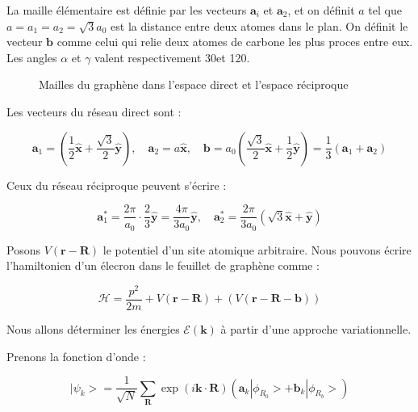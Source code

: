 La maille élémentaire est définie par les vecteurs $\mathbf{a}_i$ et
$\mathbf{a}_2$, et on définit $a$ tel que $a=a_1=a_2 = \sqrt{3}a_0$ est la
distance entre deux atomes dans le plan. On définit le vecteur $\mathbf{b}$ comme
celui qui relie deux atomes de carbone les plus proces entre eux. Les angles
$\alpha$ et $\gamma$ valent respectivement 30\textdegree et 120\textdegree.


\begin{figure}
    \TODO
    \caption{Mailles du graphène dans l'espace direct et l'espace réciproque}
    \label{fig:maillegraphene}
\end{figure}

Les vecteurs du réseau direct sont :

\begin{equation}
    \mathbf{a}_1 =
    (\frac{1}{2}\mathbf{\hat{x}}+\frac{\sqrt{3}}{2}\hat{\mathbf{y}}),\quad
    \mathbf{a}_2 = a \mathbf{\hat{x}},\quad
    \mathbf{b} = a_0
    (\frac{\sqrt{3}}{2}\hat{\mathbf{x}}+\frac{1}{2}\hat{\mathbf{y}}) =
    \frac{1}{3}(\mathbf{a}_1 + \mathbf{a}_2)
\end{equation}

Ceux du réseau réciproque peuvent s'écrire :

\begin{equation}
    \mathbf{a}_1^* = \frac{2\pi}{a_0} \cdot \frac{2}{3} \mathbf{\hat{y}} =
    \frac{4\pi}{3a_0}\mathbf{\hat{y}},\quad
    \mathbf{a}_2^* = \frac{2\pi}{3a_0}(\sqrt{3}\mathbf{\hat{x}}+\mathbf{\hat{y}})
\end{equation}

Posons $V(\mathbf{r}-\mathbf{R})$ le potentiel d'un site atomique arbitraire.
Nous pouvons écrire l'hamiltonien d'un élecron dans le feuillet de graphène comme
:

\begin{equation}
    \mathcal{H} = \frac{p^2}{2m} + V(\mathbf{r}-\mathbf{R}) + (V(\mathbf{r-R-b}))
\end{equation}

Nous allons déterminer les énergies $\mathcal{E}(\mathbf{k})$ à partir d'une
approche variationnelle.

Prenons la fonction d'onde :

\begin{equation}
    |\psi_k> = \frac{1}{\sqrt{N}} \sum_{\mathbf{R}} \exp (i
    \mathbf{k}\cdot\mathbf{R}) \left( \mathbf{a}_k |\phi_{R_0}> + \mathbf{b}_k
    |\phi_{R_b}> \right)
\end{equation}

